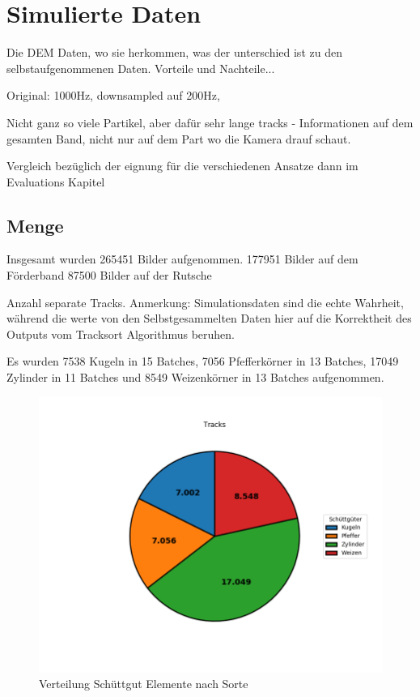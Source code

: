 \color{black}
\section{Simulierte Daten}

Die DEM Daten, wo sie herkommen, was der unterschied ist zu den selbstaufgenommenen Daten. Vorteile und Nachteile...

Original: 1000Hz, downsampled auf 200Hz, 

Nicht ganz so viele Partikel, aber dafür sehr lange tracks - Informationen auf dem gesamten Band, nicht nur auf dem Part wo die Kamera drauf schaut.

Vergleich bezüglich der eignung für die verschiedenen Ansatze dann im Evaluations Kapitel


\subsection{Menge}

Insgesamt wurden 265451 Bilder aufgenommen.
177951 Bilder auf dem Förderband
87500 Bilder auf der Rutsche


Anzahl separate Tracks.
Anmerkung: Simulationsdaten sind die echte Wahrheit, während die werte von den Selbstgesammelten Daten hier 
auf die Korrektheit des Outputs vom Tracksort Algorithmus beruhen. 

Es wurden 
7538 Kugeln in 15 Batches,
7056 Pfefferkörner in 13 Batches,
17049 Zylinder in 11 Batches
und 8549 Weizenkörner in 13 Batches aufgenommen.


\begin{figure}
    \centering
    \includegraphics[width=\textwidth]{img/scaledPieChart-trimmed}
    \caption{Verteilung Schüttgut Elemente nach Sorte}
    \label{piechartSchuettgut}
\end{figure}



